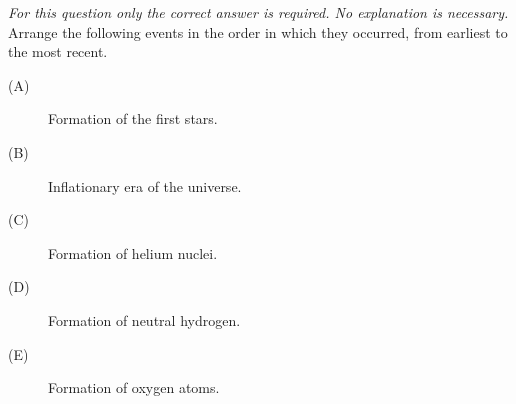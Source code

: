 \textit{For this question only the correct answer is required. No explanation is necessary.}
Arrange the following events in the order in which they occurred, from earliest to the most recent.
\begin{description}
\item[(A)] Formation of the first stars.
\item[(B)] Inflationary era of the universe.
\item[(C)] Formation of helium nuclei.
\item[(D)] Formation of neutral hydrogen.
\item[(E)] Formation of oxygen atoms.
\end{description}
